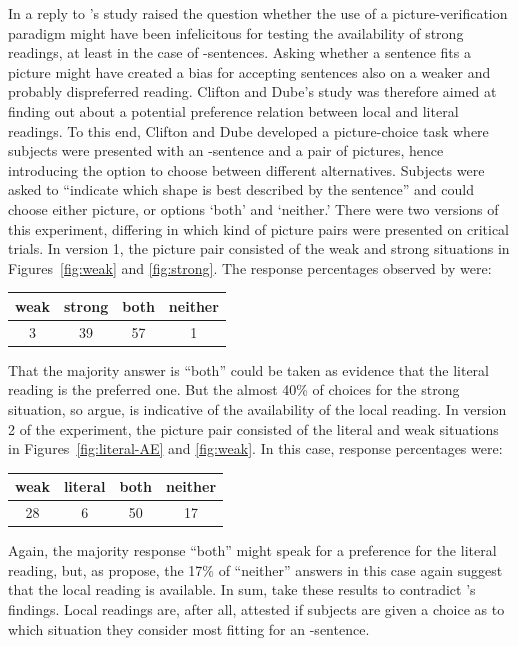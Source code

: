 \documentclass[fleqn,reqno,10pt,draft]{article}
\newcommand{\as}{\acro{as}}
\begin{document}
In a reply to \citeauthor{GeurtsPouscoulous2009:Embedded-Implic}'s
study \citet{CliftonDube2010:Embedded-Implic} raised the question
whether the use of a picture-verification paradigm might have been
infelicitous for testing the availability of strong readings, at least
in the case of \as-sentences. Asking whether a sentence fits a picture
might have created a bias for accepting sentences also on a weaker and
probably dispreferred reading. Clifton and Dube's study was therefore
aimed at finding out about a potential preference relation between
local and literal readings. To this end, Clifton and Dube developed a
picture-choice task where subjects were presented with an \as-sentence
and a pair of pictures, hence introducing the option to choose between
different alternatives. Subjects were asked to ``indicate which shape
is best described by the sentence'' and could choose either picture,
or options `both' and `neither.' There were two versions of this
experiment, differing in which kind of picture pairs were presented on
critical trials. In version 1, the picture pair consisted of the weak
and strong situations in Figures~\ref{fig:weak} and
\ref{fig:strong}. The response percentages observed by
\citeauthor{CliftonDube2010:Embedded-Implic} were:

\begin{center}
  \begin{tabular}{cccc}
    weak & strong & both & neither
    \\ \midrule 
 3 & 39 & 57 & 1 
  \end{tabular}
\end{center}

\noindent That the majority answer is ``both'' could be taken as
evidence that the literal reading is the preferred one. But the almost
40\% of choices for the strong situation, so
\citeauthor{CliftonDube2010:Embedded-Implic} argue, is indicative of
the availability of the local reading. In version 2 of the experiment,
the picture pair consisted of the literal and weak situations in
Figures~\ref{fig:literal-AE} and \ref{fig:weak}. In this case,
response percentages were:

\begin{center}
  \begin{tabular}{cccc}
    weak & literal & both & neither
    \\ \midrule 
    28 & 6 & 50 & 17 
  \end{tabular}
\end{center}

\noindent Again, the majority response ``both'' might speak for a
preference for the literal reading, but, as
\citeauthor{CliftonDube2010:Embedded-Implic} propose, the 17\% of
``neither'' answers in this case again suggest that the local reading
is available. In sum,
\citeauthor{CliftonDube2010:Embedded-Implic} take these results to
contradict \citeauthor{GeurtsPouscoulous2009:Embedded-Implic}'s
findings. Local readings are, after all, attested if subjects are
given a choice as to which situation they consider most fitting for an
\as-sentence.
\end{document}
